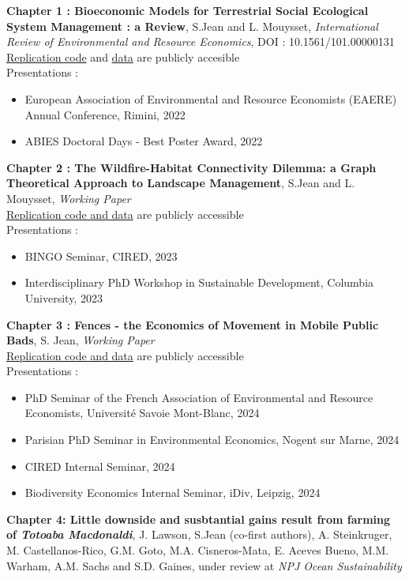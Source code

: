 \singlespacing
\textbf{Chapter 1 :  Bioeconomic Models for Terrestrial Social Ecological System Management : a Review}, S.Jean and L. Mouysset, \textit{International Review of Environmental and Resource Economics},
 DOI : 10.1561/101.00000131\\
\href{https://github.com/sim-jean/review-irere}{Replication code} and \href{https://zenodo.org/records/6656433}{data} are publicly accesible
\\
 Presentations : 
\begin{itemize}
\item European Association of Environmental and Resource Economists (EAERE) Annual Conference, Rimini, 2022
\item ABIES Doctoral Days - Best Poster Award, 2022
\end{itemize}
%
\textbf{Chapter 2 : The Wildfire-Habitat Connectivity Dilemma: a Graph Theoretical Approach to Landscape Management}, S.Jean and L. Mouysset, \textit{Working Paper}\\
\href{https://github.com/sim-jean/Landscape_connectivity_dilemma}{Replication code and data} are publicly accessible
%
\\
Presentations : 
\begin{itemize}
\item BINGO Seminar, CIRED, 2023
\item Interdisciplinary PhD Workshop in Sustainable Development, Columbia University, 2023
\end{itemize}
%
\textbf{Chapter 3 : Fences - the Economics of Movement in Mobile Public Bads}, S. Jean, \textit{Working Paper}\\
\href{https://github.com/sim-jean/fences}{Replication code and data} are publicly accessible
\\
Presentations : 
\begin{itemize}
\item PhD Seminar of the French Association of Environmental and Resource Economists, Université Savoie Mont-Blanc, 2024
\item Parisian PhD Seminar in Environmental Economics, Nogent sur Marne, 2024
\item CIRED Internal Seminar, 2024
\item Biodiversity Economics Internal Seminar, iDiv, Leipzig, 2024

\end{itemize}
%
\textbf{Chapter 4: Little downside and susbtantial gains result from farming of \textit{Totoaba Macdonaldi}}, J. Lawson, S.Jean (co-first authors), A. Steinkruger, M. Castellanos-Rico, G.M. Goto, M.A. Cisneros-Mata, E. Aceves Bueno, M.M. Warham, A.M. Sachs and S.D. Gaines,  under review at \textit{NPJ Ocean Sustainability}\\

